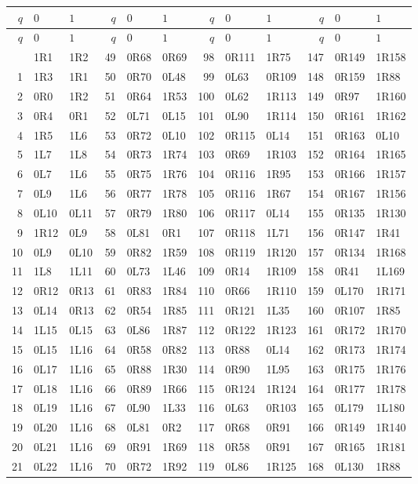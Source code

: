 \begingroup\footnotesize\ttfamily
\begin{longtable}{@{}rll@{\hspace{0.9em}}rll@{\hspace{0.9em}}rll@{\hspace{0.9em}}rll@{}}
\toprule
$q$&$0$&$1$&$q$&$0$&$1$&$q$&$0$&$1$&$q$&$0$&$1$\\\midrule\endfirsthead
\toprule $q$&$0$&$1$&$q$&$0$&$1$&$q$&$0$&$1$&$q$&$0$&$1$\\\midrule\endhead
\bottomrule\endfoot
0&1R1&1R2&49&0R68&0R69&98&0R111&1R75&147&0R149&1R158\\
1&1R3&1R1&50&0R70&0L48&99&0L63&0R109&148&0R159&1R88\\
2&0R0&1R2&51&0R64&1R53&100&0L62&1R113&149&0R97&1R160\\
3&0R4&0R1&52&0L71&0L15&101&0L90&1R114&150&0R161&1R162\\
4&1R5&1L6&53&0R72&0L10&102&0R115&0L14&151&0R163&0L10\\
5&1L7&1L8&54&0R73&1R74&103&0R69&1R103&152&0R164&1R165\\
6&0L7&1L6&55&0R75&1R76&104&0R116&1R95&153&0R166&1R157\\
7&0L9&1L6&56&0R77&1R78&105&0R116&1R67&154&0R167&1R156\\
8&0L10&0L11&57&0R79&1R80&106&0R117&0L14&155&0R135&1R130\\
9&1R12&0L9&58&0L81&0R1&107&0R118&1L71&156&0R147&1R41\\
10&0L9&0L10&59&0R82&1R59&108&0R119&1R120&157&0R134&1R168\\
11&1L8&1L11&60&0L73&1L46&109&0R14&1R109&158&0R41&1L169\\
12&0R12&0R13&61&0R83&1R84&110&0R66&1R110&159&0L170&1R171\\
13&0L14&0R13&62&0R54&1R85&111&0R121&1L35&160&0R107&1R85\\
14&1L15&0L15&63&0L86&1R87&112&0R122&1R123&161&0R172&1R170\\
15&0L15&1L16&64&0R58&0R82&113&0R88&0L14&162&0R173&1R174\\
16&0L17&1L16&65&0R88&1R30&114&0R90&1L95&163&0R175&1R176\\
17&0L18&1L16&66&0R89&1R66&115&0R124&1R124&164&0R177&1R178\\
18&0L19&1L16&67&0L90&1L33&116&0L63&0R103&165&0L179&1L180\\
19&0L20&1L16&68&0L81&0R2&117&0R68&0R91&166&0R149&1R140\\
20&0L21&1L16&69&0R91&1R69&118&0R58&0R91&167&0R165&1R181\\
21&0L22&1L16&70&0R72&1R92&119&0L86&1R125&168&0L130&1R88\\

\end{longtable}
